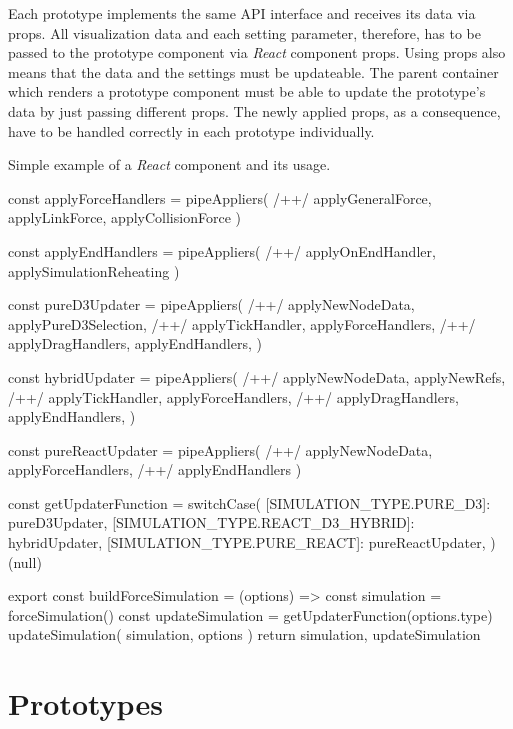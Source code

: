 Each prototype implements the same API interface and receives its data via props. All visualization data and each setting parameter, therefore, has to be passed to the prototype component via \emph{React} component props. Using props also means that the data and the settings must be updateable. The parent container which renders a prototype component must be able to update the prototype's data by just passing different props. The newly applied props, as a consequence, have to be handled correctly in each prototype individually.

\begin{program}[H]
\caption{Simple example of a \emph{React} component and its usage.} 
\label{prog:forceBuildModule}
\begin{JsCode}
const applyForceHandlers = pipeAppliers( /+\label{line:composition1}+/
  applyGeneralForce, 
  applyLinkForce, 
  applyCollisionForce
)

const applyEndHandlers = pipeAppliers( /+\label{line:composition2}+/
  applyOnEndHandler, 
  applySimulationReheating
)

const pureD3Updater = pipeAppliers( /+\label{line:updater1}+/
  applyNewNodeData,
  applyPureD3Selection, /+\label{line:applyPureD3Selection}+/
  applyTickHandler,
  applyForceHandlers, /+\label{line:applyForce1}+/
  applyDragHandlers,
  applyEndHandlers,
)

const hybridUpdater = pipeAppliers( /+\label{line:updater2}+/
  applyNewNodeData,
  applyNewRefs, /+\label{line:applyNewRefs}+/
  applyTickHandler,
  applyForceHandlers, /+\label{line:applyForce2}+/
  applyDragHandlers,
  applyEndHandlers,
)

const pureReactUpdater = pipeAppliers( /+\label{line:updater3}+/
  applyNewNodeData, 
  applyForceHandlers, /+\label{line:applyForce3}+/
  applyEndHandlers
)

const getUpdaterFunction = switchCase({
  [SIMULATION_TYPE.PURE_D3]: pureD3Updater,
  [SIMULATION_TYPE.REACT_D3_HYBRID]: hybridUpdater,
  [SIMULATION_TYPE.PURE_REACT]: pureReactUpdater,
})(null)

export const buildForceSimulation = (options) => {
  const simulation = forceSimulation()
  const updateSimulation = getUpdaterFunction(options.type)
  updateSimulation({ simulation, options })
  return { simulation, updateSimulation }
}
\end{JsCode}
\end{program}


\section{Prototypes}

